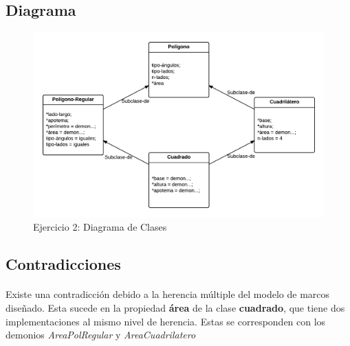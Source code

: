 \documentclass[10pt, a4paper,spanish]{article}
\begin{document}
			\begin{figure}[H]
				\centering
        
			\end{figure}

			\begin{figure}[H]
				\centering
        
			\end{figure}

    \subsection{Diagrama}

			\begin{figure}[H]
				\begin{center}
					\includegraphics[width=\textwidth]{exercise-2-diagram}
					\caption{Ejercicio 2: Diagrama de Clases}
					\label{image:diagram-2}
				\end{center}
			\end{figure}

    \subsection{Contradicciones}

      \paragraph{}
      Existe una contradicción debido a la herencia múltiple del modelo de marcos diseñado. Esta sucede en la propiedad \textbf{área} de la clase \textbf{cuadrado}, que tiene dos implementaciones al mismo nivel de herencia. Estas se corresponden con los demonios \emph{AreaPolRegular} y \emph{AreaCuadrilatero}
\end{document}
